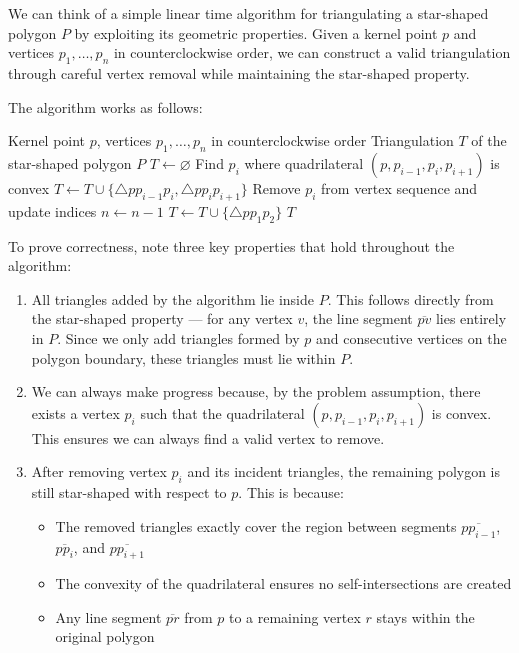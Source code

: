 \documentclass{article}
\let\emptyset\varnothing
\begin{document}
    We can think of a simple linear time algorithm for triangulating a star-shaped polygon $P$ by exploiting its geometric properties. Given a kernel point $p$ and vertices $p_1,\ldots,p_n$ in counterclockwise order, we can construct a valid triangulation through careful vertex removal while maintaining the star-shaped property.

    The algorithm works as follows:
    \bigskip
    \begin{algorithmic}
    \REQUIRE Kernel point $p$, vertices $p_1,\ldots,p_n$ in counterclockwise order
    \ENSURE Triangulation $T$ of the star-shaped polygon $P$
    \STATE $T \leftarrow \emptyset$
       \STATE Find $p_i$ where quadrilateral $(p,p_{i-1},p_i,p_{i+1})$ is convex
       \STATE $T \leftarrow T \cup \{\triangle pp_{i-1}p_i, \triangle pp_ip_{i+1}\}$
       \STATE Remove $p_i$ from vertex sequence and update indices
       \STATE $n \leftarrow n-1$
    \ENDWHILE
    \STATE $T \leftarrow T \cup \{\triangle pp_1p_2\}$
    \RETURN $T$
    \end{algorithmic}

    To prove correctness, note three key properties that hold throughout the algorithm:

    \begin{enumerate}
    \item All triangles added by the algorithm lie inside $P$. This follows directly from the star-shaped property --- for any vertex $v$, the line segment $\overline{pv}$ lies entirely in $P$. Since we only add triangles formed by $p$ and consecutive vertices on the polygon boundary, these triangles must lie within $P$.

    \item We can always make progress because, by the problem assumption, there exists a vertex $p_i$ such that the quadrilateral $(p,p_{i-1},p_i,p_{i+1})$ is convex. This ensures we can always find a valid vertex to remove.

    \item After removing vertex $p_i$ and its incident triangles, the remaining polygon is still star-shaped with respect to $p$. This is because:
       \begin{itemize}
       \item The removed triangles exactly cover the region between segments $\overline{pp_{i-1}}$, $\overline{pp_i}$, and $\overline{pp_{i+1}}$
       \item The convexity of the quadrilateral ensures no self-intersections are created
       \item Any line segment $\overline{pr}$ from $p$ to a remaining vertex $r$ stays within the original polygon
       \end{itemize}
    \end{enumerate}
\end{document}
